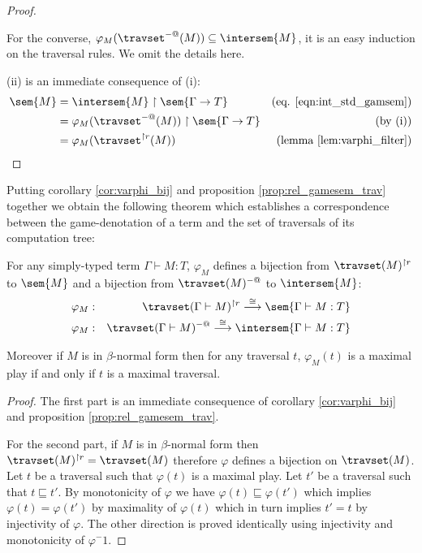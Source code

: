 \begin{proof}
\begin{itemize}
  For the converse, $\varphi_{M}( \travset^{-@}(M) ) \subseteq \intersem{M}$, it is an easy induction
  on the traversal rules. We omit the details here.
\end{itemize}

(ii) is an immediate consequence of (i):
\begin{align*}
\sem{M} &= \intersem{M} \upharpoonright \sem{\Gamma \rightarrow T} & \mbox{(eq. \ref{eqn:int_std_gamsem})} \\
        &= \varphi_M(\travset^{-@}(M)) \upharpoonright \sem{\Gamma \rightarrow T} & \mbox{(by (i))}\\
        &= \varphi_M(\travset^{\upharpoonright r}(M)) & \mbox{(lemma \ref{lem:varphi_filter})}
\end{align*}
\end{proof}


Putting corollary \ref{cor:varphi_bij} and proposition
\ref{prop:rel_gamesem_trav} together we obtain the following theorem
which establishes a correspondence between the game-denotation of a
term and the set of traversals of its computation tree:

\begin{theorem}
\label{thm:correspondence}
 For any simply-typed term $\Gamma \vdash M :T$,
$\varphi_M$ defines a bijection from $\travset(M)^{\upharpoonright
r}$ to $\sem{M}$ and a bijection from $\travset(M)^{-@}$ to
$\intersem{M}$:
\begin{eqnarray*}
 \varphi_M  &:& \travset(\Gamma \vdash M)^{\upharpoonright r} \stackrel{\cong}{\longrightarrow} \sem{\Gamma \vdash M :T} \\
 \varphi_M  &:& \travset(\Gamma \vdash M)^{-@} \stackrel{\cong}{\longrightarrow} \intersem{\Gamma \vdash M :T}
\end{eqnarray*}

Moreover if $M$ is in $\beta$-normal form then for any traversal
$t$, $\varphi_M(t)$ is a maximal play if and only if $t$ is a
maximal traversal.
\end{theorem}

\begin{proof}
The first part is an immediate consequence of corollary
\ref{cor:varphi_bij} and proposition
\ref{prop:rel_gamesem_trav}.

For the second part, if $M$ is in $\beta$-normal form then
$\travset(M)^{\upharpoonright r} = \travset(M)$ therefore $\varphi$
defines a bijection on $\travset(M)$. Let $t$ be a traversal such
that $\varphi(t)$ is a maximal play. Let $t'$ be a traversal such
that $t \sqsubseteq t'$. By monotonicity of $\varphi$ we have
$\varphi(t) \sqsubseteq \varphi(t')$ which implies $\varphi(t) =
\varphi(t')$ by maximality of $\varphi(t)$ which in turn implies
$t'=t$ by injectivity of $\varphi$. The other direction is proved
identically using injectivity and monotonicity of $\varphi^-1$.
\end{proof}

